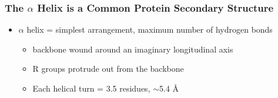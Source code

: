 \documentclass[10pt]{article}
\begin{document}
\subsubsection*{The $\alpha$ Helix is a Common Protein Secondary Structure}
\begin{itemize}
    \item $\alpha$ helix = simplest arrangement, maximum number of hydrogen bonds
    \begin{itemize}
        \item backbone wound around an imaginary longitudinal axis
        \item R groups protrude out from the backbone
        \item Each helical turn = 3.5 residues, $\sim$5.4 \r{A}
    \end{itemize}
\end{itemize}
\end{document}
